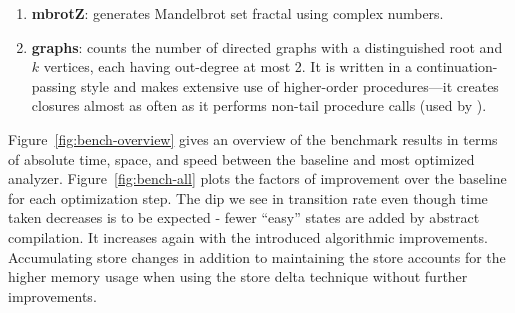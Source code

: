 \documentclass[preprint,onecolumn,9pt]{sigplanconf} %
\begin{document}
\begin{enumerate}
\item {\bf mbrotZ}: generates Mandelbrot set fractal using complex
  numbers.

\item {\bf graphs}: counts the number of directed graphs with a
  distinguished root and \(k\) vertices, each having out-degree at
  most 2. It is written in a continuation-passing style and makes
  extensive use of higher-order procedures---it creates closures
  almost as often as it performs non-tail procedure calls (used by
  \cite{dvanhorn:wright-jagannathan-toplas98,dvanhorn:jagannathan-etal-popl98}).
\end{enumerate}


Figure~\ref{fig:bench-overview} gives an overview of the benchmark
results in terms of absolute time, space, and speed between the
baseline and most optimized analyzer.  Figure~\ref{fig:bench-all}
plots the factors of improvement over the baseline for each
optimization step. The dip we see in transition rate even though time
taken decreases is to be expected - fewer ``easy'' states are added by
abstract compilation. It increases again with the introduced
algorithmic improvements. Accumulating store changes in addition to
maintaining the store accounts for the higher memory usage when using
the store delta technique without further improvements.
\end{document}
